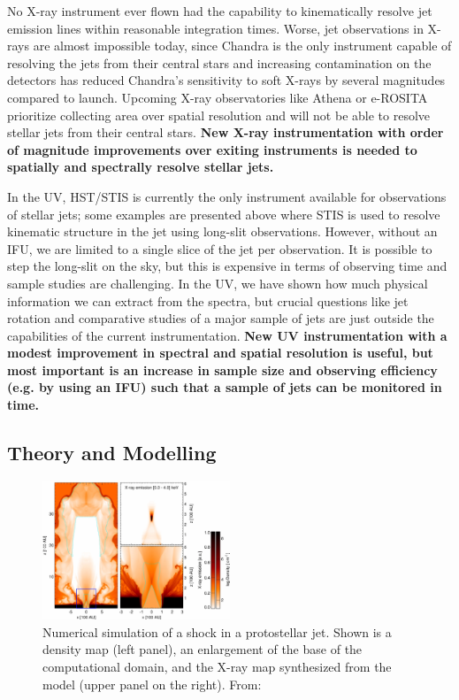 \documentclass[12pt]{article}
\begin{document}
No X-ray instrument ever flown had the capability to kinematically resolve jet emission lines within reasonable integration times. Worse, jet observations in X-rays are almost impossible today, since Chandra is the only instrument capable of resolving the jets from their central stars and increasing contamination on the detectors has reduced Chandra's sensitivity to soft X-rays by several magnitudes compared to launch. Upcoming X-ray observatories like Athena or e-ROSITA prioritize collecting area over spatial resolution and will not be able to resolve stellar jets from their central stars. \textbf{New X-ray instrumentation with order of magnitude improvements over exiting instruments is needed to spatially and spectrally resolve stellar jets.}

In the UV, HST/STIS is currently the only instrument available for observations of stellar jets; some examples are presented above where STIS is used to resolve kinematic structure in the jet using long-slit observations. However, without an IFU, we are limited to a single slice of the jet per observation. It is possible to step the long-slit on the sky, but this is expensive in terms of observing time and sample studies are challenging. In the UV, we have shown how much physical information we can extract from the spectra, but crucial questions like jet rotation and comparative studies of a major sample of jets are just outside the capabilities of the current instrumentation. \textbf{New UV instrumentation with a modest improvement in spectral and spatial resolution is useful, but most important is an increase in sample size and observing efficiency (e.g. by using an IFU) such that a sample of jets can be monitored in time. }

\subsection{Theory and Modelling}
\begin{figure}[htb]
\centering
\includegraphics[width=0.5\textwidth]{apj395310f4_lr.jpg}
\caption{Numerical simulation of a shock in a protostellar jet. Shown is a density map (left panel), an enlargement of the base of the computational domain, and the X-ray map synthesized from the model (upper panel on the right).  From: }
\label{fig:sims}
\end{figure}
\end{document}
